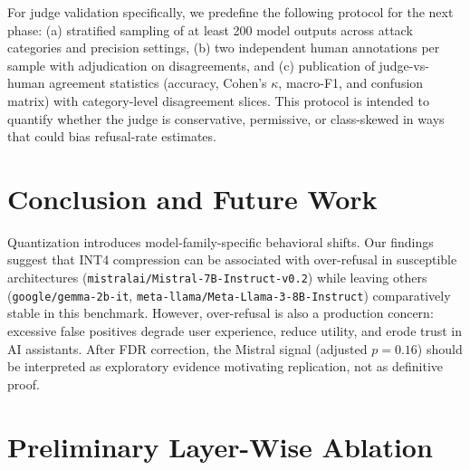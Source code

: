 \documentclass[11pt]{article}
\begin{document}
For judge validation specifically, we predefine the following protocol for the next phase: (a) stratified sampling of at least 200 model outputs across attack categories and precision settings, (b) two independent human annotations per sample with adjudication on disagreements, and (c) publication of judge-vs-human agreement statistics (accuracy, Cohen's $\kappa$, macro-F1, and confusion matrix) with category-level disagreement slices. This protocol is intended to quantify whether the judge is conservative, permissive, or class-skewed in ways that could bias refusal-rate estimates.

\section{Conclusion and Future Work}
Quantization introduces model-family-specific behavioral shifts. Our findings suggest that INT4 compression can be associated with over-refusal in susceptible architectures (\texttt{mistralai/Mistral-7B-Instruct-v0.2}) while leaving others (\texttt{google/gemma-2b-it}, \texttt{meta-llama/Meta-Llama-3-8B-Instruct}) comparatively stable in this benchmark. However, over-refusal is also a production concern: excessive false positives degrade user experience, reduce utility, and erode trust in AI assistants. After FDR correction, the Mistral signal (adjusted $p=0.16$) should be interpreted as exploratory evidence motivating replication, not as definitive proof.

\begin{center}
\end{center}




\appendix
\section{Preliminary Layer-Wise Ablation}
\label{app:layerwise}
\end{document}
